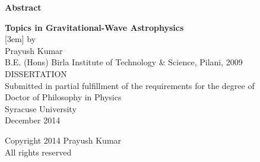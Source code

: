 
\newpage


\thispagestyle{empty}
\begin{center}
{\bf\Large Abstract}\\[0.5em]
\end{center}

\begin{quote}

\end{quote}

\newpage
\thispagestyle{empty}
\begin{center}
{\bf\LARGE Topics in Gravitational-Wave Astrophysics}\\
[3em]
 by\\[1em]
{\large Prayush Kumar}\\[1em]
B.E. (Hons) Birla Institute of Technology \& Science, Pilani, 2009\\[7em]
DISSERTATION\\
Submitted in partial fulfillment of the requirements for the degree of\\
Doctor of Philosophy in Physics\\[7em]
Syracuse University\\
{December 2014}\\[5em]
\end{center}%


\newpage
\thispagestyle{empty}
\begin{center}
\vspace*{3in}
Copyright 2014 Prayush Kumar\\[1.5em]
All rights reserved
\end{center}




